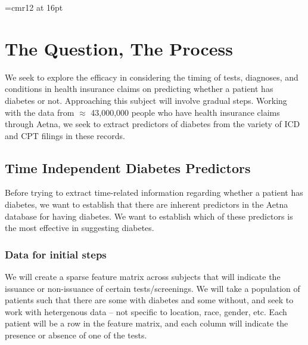 \documentclass{article}
\begin{document}
\font\myfont=cmr12 at 16pt
\maketitle



\section{The Question, The Process}
\doublespacing

We seek to explore the efficacy in considering the timing of tests, diagnoses, and conditions in health insurance claims on predicting whether a patient has diabetes or not. Approaching this subject will involve gradual steps. Working with the data from $\approx$ 43,000,000 people who have health insurance claims through Aetna, we seek to extract predictors of diabetes from the variety of ICD and CPT filings in these records. 
 

\subsection{Time Independent Diabetes Predictors}

Before trying to extract time-related information regarding whether a patient has diabetes, we want to establish that there are inherent predictors in the Aetna database for having diabetes. We want to establish which of these predictors is the most effective in suggesting diabetes. 

\subsubsection{Data for initial steps}

We will create a sparse feature matrix across subjects that will indicate the issuance or non-issuance of certain tests/screenings. We will take a population of patients such that there are some with diabetes and some without, and seek to work with hetergenous data -- not specific to location, race, gender, etc. Each patient will be a row in the feature matrix, and each column will indicate the presence or absence of one of the tests. 
\end{document}
